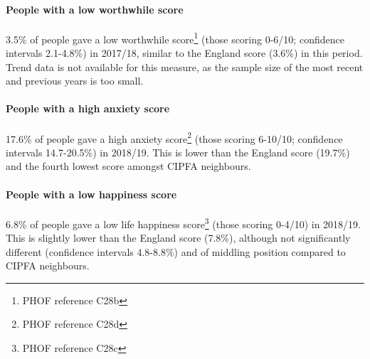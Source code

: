 \paragraph{People with a low worthwhile score} 3.5\% of people gave a low worthwhile score\footnote{PHOF reference C28b} (those scoring 0-6/10; confidence intervals 2.1-4.8\%) in 2017/18, similar to the England score (3.6\%) in this period. Trend data is not available for this measure, as the sample size of the most recent and previous years is too small.

\paragraph{People with a high anxiety score} 17.6\% of people gave a high anxiety score\footnote{PHOF reference C28d} (those scoring 6-10/10; confidence intervals 14.7-20.5\%) in 2018/19. This is lower than the England score (19.7\%) and the fourth lowest score amongst CIPFA neighbours.

\paragraph{People with a low happiness score} 6.8\% of people gave a low life happiness score\footnote{PHOF reference C28c} (those scoring 0-4/10) in 2018/19. This is slightly lower than the England score (7.8\%), although not significantly different (confidence intervals 4.8-8.8\%) and of middling position compared to CIPFA neighbours.

